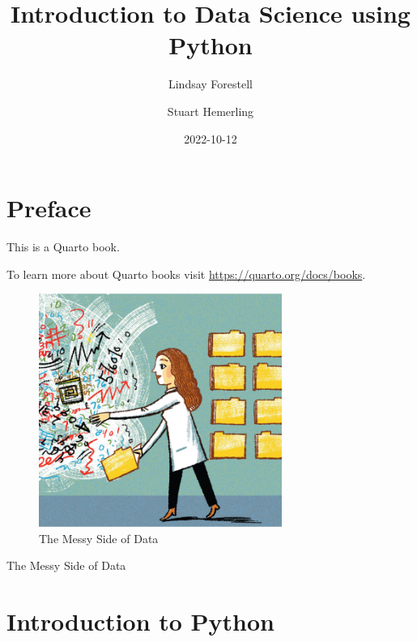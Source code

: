 \documentclass[
  letterpaper,
  DIV=11,
  numbers=noendperiod]{scrreprt}
\title{Introduction to Data Science using Python}
\author{Lindsay Forestell \and Stuart Hemerling}
\date{2022-10-12}
\renewcommand*\contentsname{Table of contents}
\newcommand\contentsname{Table of contents}
\begin{document}
\maketitle
\ifdefined\Shaded\renewenvironment{Shaded}{\begin{tcolorbox}[frame hidden, boxrule=0pt, borderline west={3pt}{0pt}{shadecolor}, interior hidden, enhanced, breakable, sharp corners]}{\end{tcolorbox}}\fi

\renewcommand*\contentsname{Table of contents}
{
\hypersetup{linkcolor=}
\setcounter{tocdepth}{3}
\tableofcontents
}

\hypertarget{preface}{%
\chapter*{Preface}\label{preface}}

This is a Quarto book.

To learn more about Quarto books visit
\url{https://quarto.org/docs/books}.

\begin{figure}

{\centering \includegraphics[width=3.125in,height=\textheight]{./images/introduction-to-python/reproducible.jpeg}

}

\caption{The Messy Side of Data}

\end{figure}

The Messy Side of Data


\hypertarget{introduction-to-python}{%
\chapter{Introduction to Python}\label{introduction-to-python}}
\end{document}
